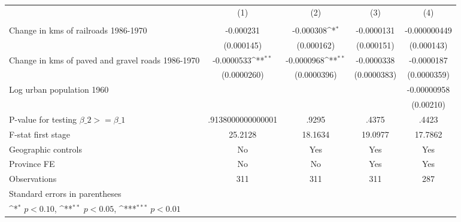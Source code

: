 {
\def\sym#1{\ifmmode^{#1}\else\(^{#1}\)\fi}
\begin{tabular}{l*{4}{c}}
\hline\hline
                &\multicolumn{1}{c}{(1)}&\multicolumn{1}{c}{(2)}&\multicolumn{1}{c}{(3)}&\multicolumn{1}{c}{(4)}\\
                &\multicolumn{1}{c}{}&\multicolumn{1}{c}{}&\multicolumn{1}{c}{}&\multicolumn{1}{c}{}\\
\hline
Change in kms of railroads 1986-1970&-0.000231         &-0.000308\sym{*}  &-0.0000131         &-0.000000449         \\
                &(0.000145)         &(0.000162)         &(0.000151)         &(0.000143)         \\
[1em]
Change in kms of paved and gravel roads 1986-1970&-0.0000533\sym{**} &-0.0000968\sym{**} &-0.0000338         &-0.0000187         \\
                &(0.0000260)         &(0.0000396)         &(0.0000383)         &(0.0000359)         \\
[1em]
Log urban population 1960&                  &                  &                  &-0.00000958         \\
                &                  &                  &                  &(0.00210)         \\
\hline
P-value for testing $\beta\_{2} >= \beta\_{1}$&.9138000000000001         &    .9295         &    .4375         &    .4423         \\
F-stat first stage&  25.2128         &  18.1634         &  19.0977         &  17.7862         \\
Geographic controls&       No         &      Yes         &      Yes         &      Yes         \\
Province FE     &       No         &       No         &      Yes         &      Yes         \\
Observations    &      311         &      311         &      311         &      287         \\
\hline\hline
\multicolumn{5}{l}{\footnotesize Standard errors in parentheses}\\
\multicolumn{5}{l}{\footnotesize \sym{*} \(p<0.10\), \sym{**} \(p<0.05\), \sym{***} \(p<0.01\)}\\
\end{tabular}
}
